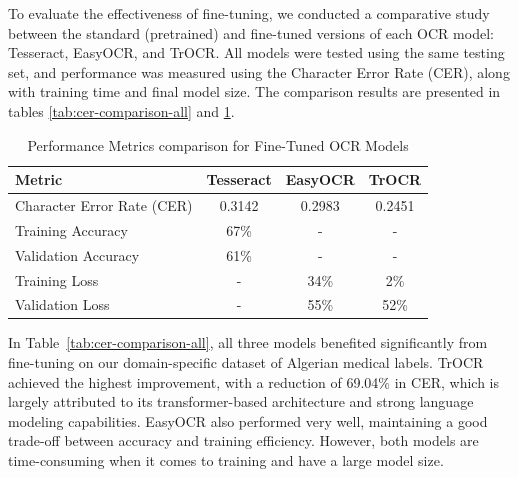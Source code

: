 To evaluate the effectiveness of fine-tuning, we conducted a comparative study between the standard (pretrained) and fine-tuned versions of each OCR model: Tesseract, EasyOCR, and TrOCR. All models were tested using the same testing set, and performance was measured using the Character Error Rate (CER), along with training time and final model size. The comparison results are presented in tables \ref{tab:cer-comparison-all} and \ref{tab:metrics-comparison}.

\vspace{0.5cm}
\begin{table}[H]
\caption{OCR models Comparison study }
\centering
{}

\label{tab:cer-comparison-all}
\end{table}

\vspace{0.5cm}
\begin{table}[H]
\caption{Performance Metrics comparison for Fine-Tuned OCR Models}
\centering
\begin{tabular}{lccc}
\hline
\textbf{Metric} & \textbf{Tesseract} & \textbf{EasyOCR} & \textbf{TrOCR} \\
\hline
Character Error Rate (CER) & 0.3142 & 0.2983 & 0.2451 \\
Training Accuracy & 67\% & - & - \\
Validation Accuracy & 61\% & - & - \\
Training Loss & - & 34\% & 2\% \\
Validation Loss & - & 55\% & 52\% \\
\hline
\end{tabular}

\label{tab:metrics-comparison}
\end{table}

In Table~\ref{tab:cer-comparison-all}, all three models benefited significantly from fine-tuning on our domain-specific dataset of Algerian medical labels. TrOCR achieved the highest improvement, with a reduction of 69.04\% in CER, which is largely attributed to its transformer-based architecture and strong language modeling capabilities. EasyOCR also performed very well, maintaining a good trade-off between accuracy and training efficiency. However, both models are time-consuming when it comes to training and have a large model size.

